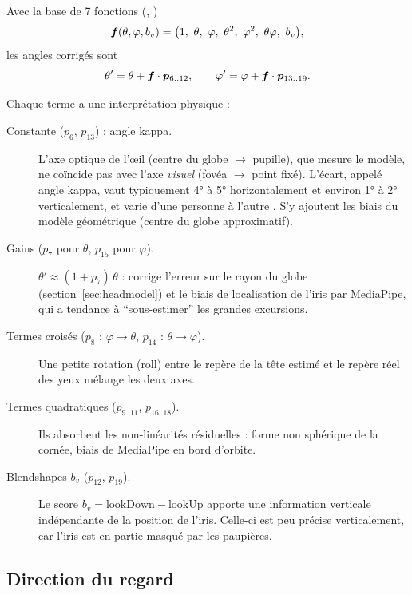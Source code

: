 Avec la base de 7 fonctions (, )
\begin{equation}
  \vect{f}(\theta, \varphi, b_v) = \big(1,\ \theta,\ \varphi,\ \theta^2,\ \varphi^2,\ \theta\varphi,\ b_v\big),
\end{equation}
les angles corrigés sont
\begin{equation}
  \theta' = \theta + \bm{f}\cdot\bm{p}_{6..12}, \qquad \varphi' = \varphi + \bm{f}\cdot\bm{p}_{13..19}.
\end{equation}

Chaque terme a une interprétation physique :
\begin{description}
  \item[Constante ($p_6$, $p_{13}$) : angle kappa.] L'axe optique de l'œil (centre du globe $\to$ pupille), que mesure le modèle, ne coïncide pas avec l'axe \emph{visuel} (fovéa $\to$ point fixé). L'écart, appelé angle kappa, vaut typiquement \ang{4} à \ang{5} horizontalement et environ \ang{1} à \ang{2} verticalement, et varie d'une personne à l'autre \cite{guestrin2006,hansen2010}. S'y ajoutent les biais du modèle géométrique (centre du globe approximatif).
  \item[Gains ($p_7$ pour $\theta$, $p_{15}$ pour $\varphi$).] $\theta' \approx (1 + p_7)\,\theta$ : corrige l'erreur sur le rayon du globe (section~\ref{sec:headmodel}) et le biais de localisation de l'iris par MediaPipe, qui a tendance à \enquote{sous-estimer} les grandes excursions.
  \item[Termes croisés ($p_8$ : $\varphi \to \theta$, $p_{14}$ : $\theta \to \varphi$).] Une petite rotation (roll) entre le repère de la tête estimé et le repère réel des yeux mélange les deux axes.
  \item[Termes quadratiques ($p_{9..11}$, $p_{16..18}$).] Ils absorbent les non-linéarités résiduelles : forme non sphérique de la cornée, biais de MediaPipe en bord d'orbite.
  \item[Blendshapes $b_v$ ($p_{12}$, $p_{19}$).] Le score $b_v = \text{lookDown} - \text{lookUp}$ apporte une information verticale indépendante de la position de l'iris. Celle-ci est peu précise verticalement, car l'iris est en partie masqué par les paupières.
\end{description}

\subsection{Direction du regard}

